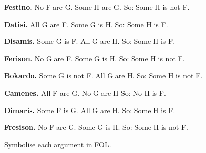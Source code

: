 \begin{ebullet}
	\item \textbf{Festino.} No F are G. Some H are G. So: Some H is not F.
	\item[] 
	\item \textbf{Datisi.} All G are F. Some G is H. So: Some H is F.
	\item[] 
	\item \textbf{Disamis.} Some G is F. All G are H. So: Some H is F.
	\item[] 
	\item \textbf{Ferison.} No G are F. Some G is H. So: Some H is not F.
	\item[] 
	\item \textbf{Bokardo.} Some G is not F. All G are H. So:  Some H is not F.
	\item[] 
	\item \textbf{Camenes.} All F are G. No G are H So: No H is F.
	\item[] 
	\item \textbf{Dimaris.} Some F is G. All G are H. So: Some H is F.
	\item[] 
	\item \textbf{Fresison.} No F are G. Some G is H. So: Some H is not F.
	\item[] 
\end{ebullet}
Symbolise each argument in FOL.

